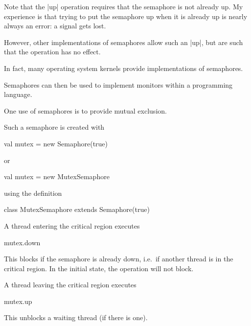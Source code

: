 \begin{slide}

Note that the |up| operation requires that the semaphore is not already up.
My experience is that trying to put the semaphore up when it is already up is
nearly always an error: a signal gets lost.

However, other implementations of semaphores allow such an |up|, but are such
that the operation has no effect. 

In fact, many operating system kernels provide implementations of semaphores.  

Semaphores can then be used to implement monitors within a programming
language. 





\end{slide}


\begin{slide}

One use of semaphores is to provide mutual exclusion.  

Such a semaphore is created with
\begin{scala}
  val mutex = new Semaphore(true)
\end{scala}
or
\begin{scala}
  val mutex = new MutexSemaphore
\end{scala}
%
using the definition
%
\begin{scala}
class MutexSemaphore extends Semaphore(true)
\end{scala}
\end{slide}


\begin{slide}

A thread entering the critical region executes
\begin{scala}
  mutex.down
\end{scala}
%
This blocks if the semaphore is already down, i.e.~if another thread is in the
critical region.  In the initial state, the operation will not block. 

A thread leaving the critical region executes
\begin{scala}
  mutex.up
\end{scala}
%
This unblocks a waiting thread (if there is one).
\end{slide}

